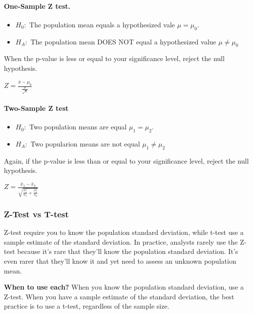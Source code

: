 \documentclass[11pt]{article}
\providecommand{\tightlist}{%
      \setlength{\itemsep}{0pt}\setlength{\parskip}{0pt}}
\begin{document}
\hypertarget{one-sample-z-test.}{%
\paragraph{One-Sample Z test.}\label{one-sample-z-test.}}

\begin{itemize}
\tightlist
\item
  \(H_0:\) The population mean equals a hypothesized vale
  \(\mu = \mu_0\).
\item
  \(H_A:\) The population mean DOES NOT equal a hypothesized value
  \(\mu \neq \mu_0\)
\end{itemize}

When the p-value is less or equal to your significance level, reject the
null hypothesis.

\(Z = \frac{\bar{x} - \mu_0}{\frac{\sigma}{\sqrt{n}}}\)

\hypertarget{two-sample-z-test}{%
\paragraph{Two-Sample Z test}\label{two-sample-z-test}}

\begin{itemize}
\tightlist
\item
  \(H_0:\) Two population means are equal \(\mu_1 = \mu_2\).
\item
  \(H_A:\) Two popularion means are not equal \(\mu_1 \neq \mu_2\)
\end{itemize}

Again, if the p-value is less than or equal to your significance level,
reject the null hypothesis.

\(Z = \frac{\bar{x}_1 - \bar{x}_2}{\sqrt{\frac{\sigma^2_1}{n_1} + \frac{\sigma^2_1}{n_2}}}\)

\hypertarget{z-test-vs-t-test}{%
\subsubsection{Z-Test vs T-test}\label{z-test-vs-t-test}}

Z-test require you to know the population standard deviation, while
t-test use a sample estimate of the standard deviation. In practice,
analysts rarely use the Z-test because it's rare that they'll know the
population standard deviation. It's even rarer that they'll know it and
yet need to assess an unknown population mean.

\textbf{When to use each?} When you know the population standard
deviation, use a Z-test. When you have a sample estimate of the standard
deviation, the best practice is to use a t-test, regardless of the
sample size.
\end{document}
